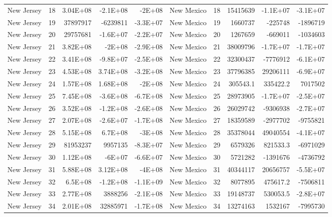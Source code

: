 \begin{table}[]
\begin{tabular}{lrrrrlrrrr}
		New Jersey &  18 & 3.04E+08 & -2.1E+08 & -2E+08 & New Mexico &  18 & 15415639 & -1.1E+07 & -3.1E+07 \\
		New Jersey &  19 & 37897917 & -6239811 & -3.3E+07 & New Mexico &  19 & 1660737 & -225748 & -1896719 \\
		New Jersey &  20 & 29757681 & -1.6E+07 & -2.2E+07 & New Mexico &  20 & 1267659 & -669011 & -1034603 \\
		New Jersey &  21 & 3.82E+08 & -2E+08 & -2.9E+08 & New Mexico &  21 & 38009796 & -1.7E+07 & -1.7E+07 \\
		New Jersey &  22 & 3.41E+08 & -9.8E+07 & -2.5E+08 & New Mexico &  22 & 32300437 & -7776912 & -6.1E+07 \\
		New Jersey &  23 & 4.53E+08 & 3.74E+08 & -3.2E+08 & New Mexico &  23 & 37796385 & 29206111 & -6.9E+07 \\
		New Jersey &  24 & 1.57E+08 & 1.68E+08 & -2E+08 & New Mexico &  24 & 305543.1 & 335422.2 & 7017502 \\
		New Jersey &  25 & 7.45E+08 & -3.6E+08 & -6.7E+08 & New Mexico &  25 & 28973905 & -1.7E+07 & -2.5E+07 \\
		New Jersey &  26 & 3.52E+08 & -1.2E+08 & -2.6E+08 & New Mexico &  26 & 26029742 & -9306938 & -2.7E+07 \\
		New Jersey &  27 & 2.07E+08 & -2.6E+07 & -1.7E+08 & New Mexico &  27 & 18359589 & -2977702 & -9755821 \\
		New Jersey &  28 & 5.15E+08 & 6.7E+08 & -3E+08 & New Mexico &  28 & 35378044 & 49040554 & -4.1E+07 \\
		New Jersey &  29 & 81953237 & 9957135 & -8.3E+07 & New Mexico &  29 & 6579326 & 821533.3 & -6971029 \\
		New Jersey &  30 & 1.12E+08 & -6E+07 & -6.6E+07 & New Mexico &  30 & 5721282 & -1391676 & -4736792 \\
		New Jersey &  31 & 5.88E+08 & 3.12E+08 & -4E+08 & New Mexico &  31 & 40344117 & 20656757 & -5.5E+07 \\
		New Jersey &  32 & 6.5E+08 & -1.2E+08 & -1.1E+09 & New Mexico &  32 & 8077895 & 475617.2 & -7506811 \\
		New Jersey &  33 & 2.77E+08 & 3888256 & -2.1E+08 & New Mexico &  33 & 19148737 & 530053.5 & -2.8E+07 \\
		New Jersey &  34 & 2.01E+08 & 32885971 & -1.7E+08 & New Mexico &  34 & 13274163 & 1532167 & -7995730
	\end{tabular}
\end{table}

